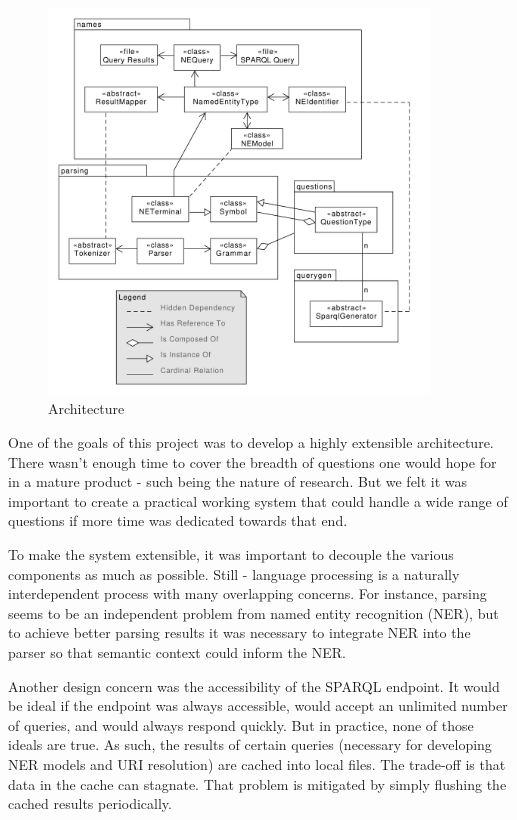 \documentclass[11pt]{article}
\begin{document}
\begin{figure}[h!]
    \centering
    \includegraphics[width=0.9\textwidth,natwidth=1,natheight=1]{umlet/architecture.pdf}
    \caption{Architecture}
    \label{fig:arch}
\end{figure}


One of the goals of this project was to develop a
highly extensible architecture. There wasn't enough time to cover the
breadth of questions one would hope for in a mature product - such being
the nature of research. But we felt it was important to create a practical
working system that could handle a wide range of questions if more
time was dedicated towards that end.

To make the system extensible, it was important to decouple the various
components as much as possible. Still - language processing is a naturally
interdependent process with many overlapping concerns. For instance,
parsing seems to be an independent problem from named entity recognition (NER),
but to achieve better parsing results it was necessary to integrate NER into the
parser so that semantic context could inform the NER. 

Another design concern was the accessibility of the SPARQL endpoint.
It would be ideal if the endpoint was always accessible, would accept an unlimited
number of queries, and would always respond quickly. But in practice, none of
those ideals are true. As such, the results of certain queries
(necessary for developing NER models and URI resolution) are cached into local files.
The trade-off is that data in the cache can stagnate. That problem is mitigated by 
simply flushing the cached results periodically.
\end{document}
